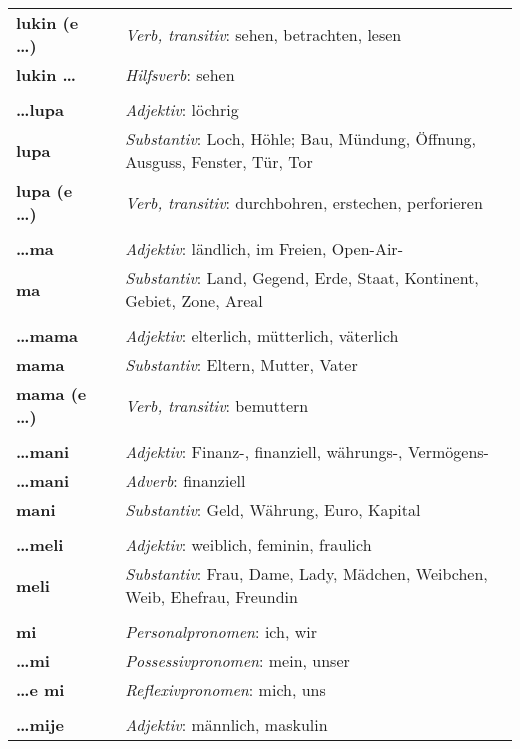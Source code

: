 \begin{supertabular}{p{2,5cm}|ll}
\textbf{lukin (e \dots)} && \textit{Verb, transitiv}: sehen, betrachten, lesen \\ 
\textbf{lukin \dots} && \textit{Hilfsverb}: sehen \\ 
 && \\ %
\textbf{\dots lupa} && \textit{Adjektiv}: löchrig \\
\textbf{lupa} && \textit{Substantiv}: Loch, Höhle; Bau, Mündung, Öffnung, Ausguss, Fenster, Tür, Tor \\ 
\textbf{lupa (e \dots)} && \textit{Verb, transitiv}: durchbohren, erstechen, perforieren \\ 
 && \\ %
\textbf{\dots ma} && \textit{Adjektiv}: ländlich, im Freien, Open-Air- \\ 
\textbf{ma} && \textit{Substantiv}: Land, Gegend, Erde, Staat, Kontinent, Gebiet, Zone, Areal \\ 
 && \\ %
\textbf{\dots mama} && \textit{Adjektiv}: elterlich, mütterlich, väterlich \\ 
\textbf{mama} && \textit{Substantiv}: Eltern, Mutter, Vater \\ 
\textbf{mama (e \dots)} && \textit{Verb, transitiv}: bemuttern \\ 
 && \\ %
\textbf{\dots mani} && \textit{Adjektiv}: Finanz-, finanziell, währungs-, Vermögens- \\ 
\textbf{\dots mani} && \textit{Adverb}: finanziell \\ 
\textbf{mani} && \textit{Substantiv}: Geld, Währung, Euro, Kapital \\ 
 && \\ %
\textbf{\dots meli} && \textit{Adjektiv}: weiblich, feminin, fraulich \\ 
\textbf{meli} && \textit{Substantiv}: Frau, Dame, Lady, Mädchen, Weibchen, Weib, Ehefrau, Freundin \\ 
 && \\ %
\textbf{mi} && \textit{Personalpronomen}: ich, wir  \\ 
\textbf{\dots mi} && \textit{Possessivpronomen}: mein, unser \\  
\textbf{\dots e mi} && \textit{Reflexivpronomen}: mich, uns  \\ 
 && \\ %
\textbf{\dots mije} && \textit{Adjektiv}: männlich, maskulin \\ 

\end{supertabular}
